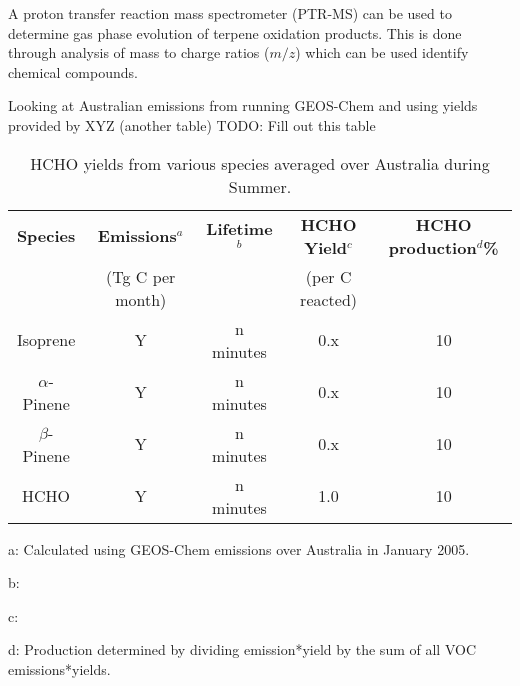     A proton transfer reaction mass spectrometer (PTR-MS) can be used to determine gas phase evolution of terpene oxidation products.
    This is done through analysis of mass to charge ratios ($m/z$) which can be used identify chemical compounds.
    
    Looking at Australian emissions from running GEOS-Chem and using yields provided by XYZ (another table)
    TODO: Fill out this table
    \begin{table} \begin{threeparttable}
      \caption{HCHO yields from various species averaged over Australia during Summer.}
      \begin{tabular}{ | c  c  c  c  c | }
        \toprule
	  \textbf{Species}   & \textbf{Emissions$^a$}& \textbf{Lifetime$^b$}& \textbf{HCHO Yield$^c$} & \textbf{HCHO production$^d$\%}
	  \\                 & (Tg C per month)      &                      & (per C reacted)         &         \\
	\midrule
	  Isoprene           & Y                     & n minutes            & 0.x                     & 10       \\
	  $\alpha$-Pinene    & Y                     & n minutes            & 0.x                     & 10       \\
	  $\beta$-Pinene     & Y                     & n minutes            & 0.x                     & 10       \\
	  HCHO               & Y                     & n minutes            & 1.0                     & 10       \\
	\bottomrule
      \end{tabular}
      \begin{tablenotes} 
	  \item a: Calculated using GEOS-Chem emissions over Australia in January 2005.
	  \item b:  
	  \item c: 
	  \item d: Production determined by dividing emission*yield by the sum of all VOC emissions*yields. 
      \end{tablenotes}
      \label{ch_isop:tab:VOCAusYields}
    \end{threeparttable} \end{table}
    
    
